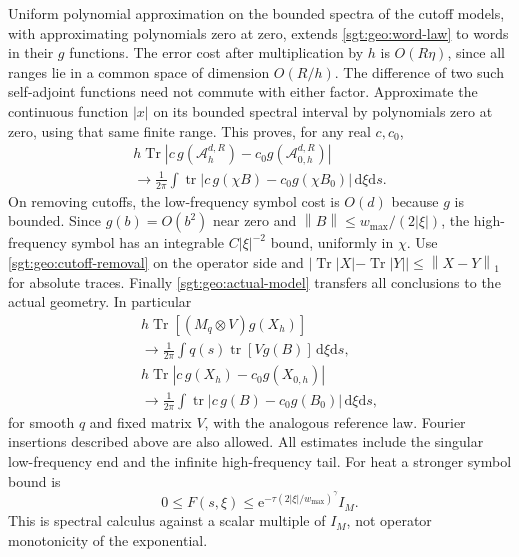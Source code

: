 \documentclass[aps,pra,reprint,superscriptaddress,longbibliography]{revtex4-2}
\newcommand{\Tr}{\operatorname{Tr}}
\newcommand{\dd}{\mathrm d}
\newcommand{\ee}{\mathrm e}
\newcommand{\norm}[1]{\left\lVert#1\right\rVert}
\begin{document}
Uniform polynomial approximation on the bounded spectra of the
cutoff models, with approximating polynomials zero at zero, extends
\eqref{sgt:geo:word-law} to words in their $g$ functions.  The error
cost after multiplication by $h$ is $O(R\eta)$, since all ranges lie
in a common space of dimension $O(R/h)$.  The difference of two such
self-adjoint functions need not commute with either factor.
Approximate the continuous function $|x|$ on its bounded spectral
interval by polynomials zero at zero, using that same finite range.
This proves, for any real $c,c_0$,
\[
\begin{gathered}
 h\Tr\left|c\,g(\mathcal A_h^{d,R})
                   -c_0g(\mathcal A_{0,h}^{d,R})\right|
\\
 \longrightarrow\frac1{2\pi}\int
 \operatorname{tr}|c\,g(\chi B)-c_0g(\chi B_0)|\,\dd\xi\dd s.
\end{gathered}
\]
On removing cutoffs, the low-frequency symbol cost is $O(d)$ because
$g$ is bounded.  Since $g(b)=O(b^2)$ near zero and
$\norm{B}\leq w_{\max}/(2|\xi|)$, the high-frequency symbol has an
integrable $C|\xi|^{-2}$ bound, uniformly in $\chi$.
Use \eqref{sgt:geo:cutoff-removal} on the operator side and
$|\Tr|X|-\Tr|Y||\leq\norm{X-Y}_1$ for absolute traces.
Finally \eqref{sgt:geo:actual-model} transfers all conclusions to the
actual geometry.  In particular
\begin{gather}
 h\Tr[(M_q\otimes V)g(X_h)]
\\
 \longrightarrow\frac1{2\pi}\int
              q(s)\operatorname{tr}[Vg(B)]\,\dd\xi\dd s,
 \label{sgt:geo:general-trace}\\
 h\Tr|c\,g(X_h)-c_0g(X_{0,h})|
\\
 \longrightarrow\frac1{2\pi}\int
             \operatorname{tr}|c\,g(B)-c_0g(B_0)|\,\dd\xi\dd s,
 \label{sgt:geo:general-absolute}
\end{gather}
for smooth $q$ and fixed matrix $V$, with the analogous reference law.
Fourier insertions described above are also allowed.  All estimates
include the singular low-frequency end and the infinite high-frequency
tail.  For heat a stronger symbol bound is
\begin{equation}
 0\leq F(s,\xi)\leq
       \ee^{-\tau(2|\xi|/w_{\max})^\gamma}I_M.
 \label{sgt:geo:heat-majorant}
\end{equation}
This is spectral calculus against a scalar multiple of $I_M$, not
operator monotonicity of the exponential.
\end{document}
